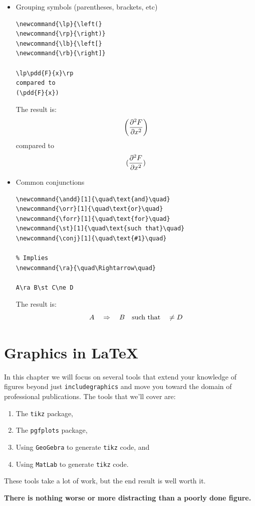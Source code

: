 \begin{itemize}
\item Grouping symbols (parentheses, brackets, etc) 
\begin{verbatim}
\newcommand{\lp}{\left(}
\newcommand{\rp}{\right)}
\newcommand{\lb}{\left[}
\newcommand{\rb}{\right]}

\lp\pdd{F}{x}\rp
compared to
(\pdd{F}{x})
\end{verbatim}

The result is:
\[\lp\pdd{F}{x}\rp\]
compared to
\[(\frac{\partial^2{F}}{\partial{x}^2})\]

\item Common conjunctions
\begin{verbatim}
\newcommand{\andd}[1]{\quad\text{and}\quad}
\newcommand{\orr}[1]{\quad\text{or}\quad}
\newcommand{\forr}[1]{\quad\text{for}\quad}
\newcommand{\st}[1]{\quad\text{such that}\quad}
\newcommand{\conj}[1]{\quad\text{#1}\quad}

% Implies
\newcommand{\ra}{\quad\Rightarrow\quad}

A\ra B\st C\ne D
\end{verbatim}

The result is:
\[A\ra B\st C\ne D\]
\end{itemize}



\section{Graphics in \LaTeX}
In this chapter we will focus on several tools that extend your knowledge of figures
beyond just \texttt{includegraphics} and move you toward the domain of professional
publications.  The tools that we'll cover are:
   
\begin{enumerate}
    \item The \texttt{tikz} package,
    \item The \texttt{pgfplots} package,
    \item Using \texttt{GeoGebra} to generate \texttt{tikz} code, and 
    \item Using \texttt{MatLab} to generate \texttt{tikz} code.
\end{enumerate}

These tools take a lot of work, but the end result is well worth it.  
\begin{center}
    {\bf There is nothing worse or more distracting than a poorly done figure.}
\end{center}

